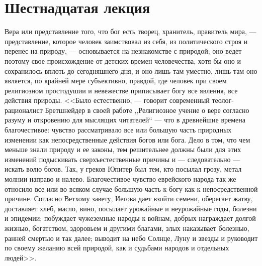 \documentclass[12pt]{article}
\begin{document}
{}
\section*{Шестнадцатая лекция}

Вера или представление того, что бог есть творец, хранитель, правитель мира, --- представление, которое человек заимствовал из себя, из политического строя и перенес на природу, --- основывается на незнакомстве с природой; оно ведет поэтому свое происхождение от детских времен человечества, хотя бы оно и сохранилось вплоть до сегодняшнего дня, и оно лишь там уместно, лишь там оно является, по крайней мере субъективно, правдой, где человек при своем религиозном простодушии и невежестве приписывает богу все явления, все действия природы. <<Было естественно, --- говорит современный теолог-рационалист Бретшнейдер в своей работе ,,Религиозное учение о вере согласно разуму и откровению для мыслящих читателей`` --- что в древнейшие времена благочестивое: чувство рассматривало все или большую часть природных изменении как непосредственные действия богов или бога. Дело в том, что чем меньше знали природу и ее законы, тем решительнее должны были для этих изменений подыскивать сверхъестественные причины и --- следовательно --- искать волю богов. Так, у греков Юпитер был тем, кто посылал грозу, метал молнии направо и налево. Благочестивое чувство еврейского народа так же относило все или во всяком случае большую часть к богу как к непосредственной причине. Согласно Ветхому завету, Иегова дает взойти семени, оберегает жатву, доставляет хлеб, масло, вино, посылает урожайные и неурожайные годы, болезни и эпидемии; побуждает чужеземные народы к войнам, добрых награждает долгой жизнью, богатством, здоровьем и другими благами, злых наказывает болезнью, ранней смертью и так далее; выводит на небо Солнце, Луну и звезды и руководит по своему желанию всей природой, как и судьбами народов и отдельных людей>>. 
\end{document}
